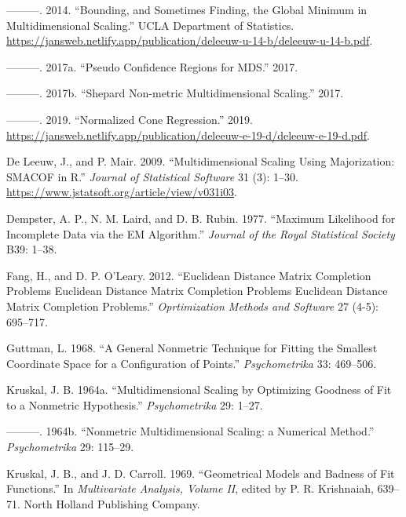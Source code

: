 \documentclass[
  12pt,
]{article}
\newlength{\cslhangindent}
\newenvironment{CSLReferences}[2] %
 {\begin{list}{}{%
  \setlength{\itemindent}{0pt}
  \setlength{\leftmargin}{0pt}
  \setlength{\parsep}{0pt}
  \ifodd #1
   \setlength{\leftmargin}{\cslhangindent}
   \setlength{\itemindent}{-1\cslhangindent}
  \fi
  \setlength{\itemsep}{#2\baselineskip}}}
 {\end{list}}
\begin{document}
\begin{CSLReferences}{1}{0}
---------. 2014. {``{Bounding, and Sometimes Finding, the Global Minimum in Multidimensional Scaling}.''} UCLA Department of Statistics. \url{https://jansweb.netlify.app/publication/deleeuw-u-14-b/deleeuw-u-14-b.pdf}.

---------. 2017a. {``{Pseudo Confidence Regions for MDS}.''} 2017.

---------. 2017b. {``{Shepard Non-metric Multidimensional Scaling}.''} 2017.

---------. 2019. {``Normalized Cone Regression.''} 2019. \url{https://jansweb.netlify.app/publication/deleeuw-e-19-d/deleeuw-e-19-d.pdf}.

De Leeuw, J., and P. Mair. 2009. {``{Multidimensional Scaling Using Majorization: SMACOF in R}.''} \emph{Journal of Statistical Software} 31 (3): 1--30. \url{https://www.jstatsoft.org/article/view/v031i03}.

Dempster, A. P., N. M. Laird, and D. B. Rubin. 1977. {``{Maximum Likelihood for Incomplete Data via the EM Algorithm}.''} \emph{Journal of the Royal Statistical Society} B39: 1--38.

Fang, H., and D. P. O'Leary. 2012. {``Euclidean Distance Matrix Completion Problems Euclidean Distance Matrix Completion Problems Euclidean Distance Matrix Completion Problems.''} \emph{Oprtimization Methods and Software} 27 (4-5): 695--717.

Guttman, L. 1968. {``{A General Nonmetric Technique for Fitting the Smallest Coordinate Space for a Configuration of Points}.''} \emph{Psychometrika} 33: 469--506.

Kruskal, J. B. 1964a. {``{Multidimensional Scaling by Optimizing Goodness of Fit to a Nonmetric Hypothesis}.''} \emph{Psychometrika} 29: 1--27.

---------. 1964b. {``{Nonmetric Multidimensional Scaling: a Numerical Method}.''} \emph{Psychometrika} 29: 115--29.

Kruskal, J. B., and J. D. Carroll. 1969. {``{Geometrical Models and Badness of Fit Functions}.''} In \emph{Multivariate Analysis, Volume II}, edited by P. R. Krishnaiah, 639--71. North Holland Publishing Company.


\end{CSLReferences}
\end{document}
